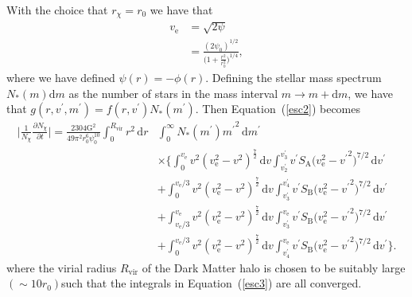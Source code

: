 \documentclass[aps,floatfix,prd,showpacs]{revtex4}
\newcommand{\diff}{\mathrm{d}}
\newcommand{\vesc}{v_{\text{e}}}
\newcommand{\vp}{v^\prime}
\newcommand{\mpr}{m^\prime}
\newcommand{\SA}{S_{\text{A}}}
\newcommand{\SB}{S_{\text{B}}}
\newcommand{\G}{\text{G}}
\newcommand{\rx}{r_\chi}
\newcommand{\Nx}{N_\chi}
\newcommand{\Rvir}{R_{\mathrm{vir}}}
\begin{document}
With the choice that $\rx = r_0$ we have that 
%
\begin{equation}
\begin{split}
\vesc &= \sqrt{2\psi} \\
&= \frac{(2\psi_0)^{1/2}}{\big(1+\frac{r^2}{r_0^2}\big)^{1/4}},
\end{split}
\end{equation}
%
%
where we have defined $\psi(r) = -\phi(r)$. Defining the stellar mass spectrum $N_*(m)\diff m$ as the number of stars in the mass interval $m \rightarrow m+\diff m$, we have that $g(r,\vp,\mpr) = f(r,\vp)N_*(\mpr)$. Then Equation~(\ref{esc2}) becomes
%
\begin{equation}
\label{esc3}
\begin{split}
\bigg|\frac{1}{\Nx}\frac{\partial \Nx}{\partial t}\bigg| = \frac{2304\G^2}{49\pi^2 r_0^6\psi_0^{10}}\int^{\Rvir}_0{r^2}\,\diff r&\int^\infty_0{N_*(\mpr)\mpr}^2\,\diff \mpr \\
& \times \Bigg\{ \int^{\vesc}_0{v^2(\vesc^2 - {v}^2)^\frac{7}{2}}\,\diff v\int^{\vp_3}_{\vp_2}{\vp \SA{(\vesc^2-{\vp}^2})^{7/2}}\,\diff \vp \\
&+ \int^{\vesc/3}_0{v^2(\vesc^2 - {v}^2)^\frac{7}{2}}\,\diff v\int^{\vp_4}_{\vp_3}{\vp \SB{(\vesc^2-{\vp}^2})^{7/2}}\,\diff \vp \\ &+ \int^{\vesc}_{\vesc/3}{v^2(\vesc^2 - {v}^2)^\frac{7}{2}}\,\diff v\int^{\vesc}_{\vp_3}{\vp \SB{(\vesc^2-{\vp}^2})^{7/2}}\,\diff \vp \\
&+ \int^{\vesc/3}_0{v^2(\vesc^2 - {v}^2)^\frac{7}{2}}\,\diff v\int^{\vesc}_{\vp_4}{\vp \SB{(\vesc^2-{\vp}^2})^{7/2}}\,\diff \vp\Bigg\}.
\end{split}
\end{equation}
%
%
where the virial radius $\Rvir$ of the Dark Matter halo is chosen to be suitably large $(\sim 10r_0)$such that the integrals in Equation~(\ref{esc3}) are all converged. 
\end{document}
